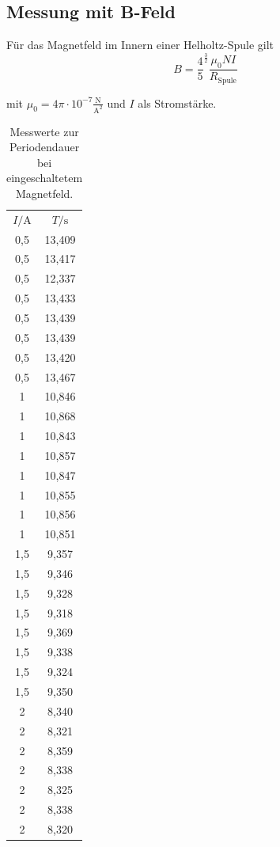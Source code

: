 \subsection{Messung mit B-Feld}

Für das Magnetfeld im Innern einer Helholtz-Spule gilt
\begin{equation}
  B=\frac{4}{5}^{\frac{3}{2}} \frac{\mu_0 N I}{R_\mathrm{Spule}}
\end{equation}

mit $\mu_0=4\pi \cdot 10^{-7} \frac{\si{\newton}}{\si{\ampere}^2}$ und $I$ als Stromstärke.

\begin{table}
  \caption{Messwerte zur Periodendauer bei eingeschaltetem Magnetfeld.}
  \centering
  \label{tab:mag}
  \begin{tabular}{c c }
    \toprule
    $I/ \si{\ampere}$ & $T / \si{\second}$ \\
0,5 & 13,409 \\
0,5 & 13,417 \\
0,5 & 12,337 \\
0,5 & 13,433 \\
0,5 & 13,439 \\
0,5 & 13,439 \\
0,5 & 13,420 \\
0,5 & 13,467 \\
1 & 10,846 \\
1 & 10,868 \\
1 & 10,843 \\
1 & 10,857 \\
1 & 10,847 \\
1 & 10,855 \\
1 & 10,856 \\
1 & 10,851 \\
1,5 & 9,357 \\
1,5 & 9,346 \\
1,5 & 9,328 \\
1,5 & 9,318 \\
1,5 & 9,369 \\
1,5 & 9,338 \\
1,5 & 9,324 \\
1,5 & 9,350 \\
2 & 8,340 \\
2 & 8,321 \\
2 & 8,359 \\
2 & 8,338 \\
2 & 8,325 \\
2 & 8,338 \\
2 & 8,320 \\

\end{tabular}
\end{table}
